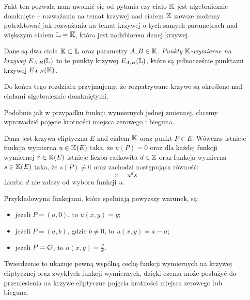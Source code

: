 Fakt ten pozwala nam uwolnić się od pytania
czy ciało $\mathbb{K}$ jest algebraicznie domknięte --
rozważania na temat krzywej nad ciałem $\mathbb{K}$
zawsze możemy potraktować
jak rozważania na temat krzywej o tych samych parametrach
nad większym ciałem $\mathbb{L} = \overline{\mathbb{K}}$,
która jest nadzbiorem danej krzywej.

\begin{definition}
Dane są dwa ciała $\mathbb{K} \subset \mathbb{L}$ oraz parametry $A, B \in \mathbb{K}$.
\emph{Punkty $\mathbb{K}$-wymierne na krzywej $E_{A,B}(\mathbb{L})$}
to te punkty krzywej $E_{A,B}(\mathbb{L})$,
które są jednocześnie punktami krzywej $E_{A,B}(\mathbb{K})$.
\end{definition}

\begin{remark}
Do końca tego rozdziału przyjmujemy,
że rozpatrywane krzywe są określone nad ciałami algebraicznie domkniętymi.
\end{remark}

Podobnie jak w przypadku funkcji wymiernych jednej zmiennej,
chcemy wprowadzić pojęcie krotności miejsca zerowego i bieguna.

\begin{theorem}\label{uniformizer_existence_theorem}
Dana jest krzywa eliptyczna $E$ nad ciałem $\mathbb{K}$
oraz punkt $P \in E$.
Wówczas istnieje funkcja wymierna $u \in \mathbb{K}(E)$ taka, że $u(P) = 0$
oraz dla każdej funkcji wymiernej $r \in \mathbb{K}(E)$
istnieje liczba całkowita $d \in \mathbb{Z}$
oraz funkcja wymierna $s \in \mathbb{K}(E)$ taka,
że $s(P) \neq 0$ oraz zachodzi następująca równość:
\begin{equation}\label{uniformizer_decomposition_eqn}
r = u^ds
\end{equation}
Liczba $d$ nie zależy od wyboru funkcji $u$.

Przykładowymi funkcjami, które spełniają powyższy warunek, są:
\begin{itemize}
\item jeżeli $P = (a, 0)$, to $u(x, y) = y$;
\item jeżeli $P = (a, b)$, gdzie $b \neq 0$, to $u(x, y) = x - a$;
\item jeżeli $P = \mathcal{O}$, to $u(x, y) = \frac{y}{x}$.
\end{itemize}
\end{theorem}

Twierdzenie to ukazuje pewną wspólną cechę
funkcji wymiernych na krzywej eliptycznej
oraz zwykłych funkcji wymiernych,
dzięki czemu może posłużyć do przeniesienia na krzywe eliptyczne
pojęcia krotności miejsca zerowego lub bieguna.

